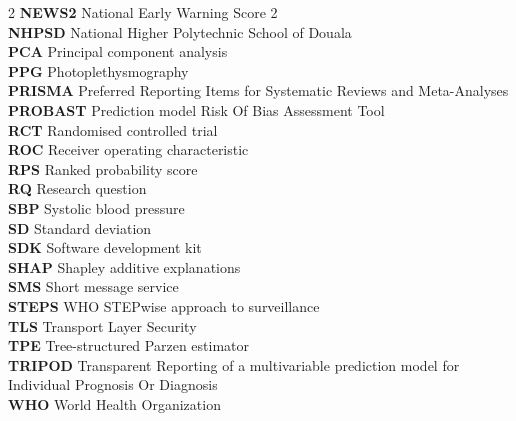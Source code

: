 {\begin{multicols}{2}
\textbf{NEWS2} National Early Warning Score 2\\
\textbf{NHPSD} National Higher Polytechnic School of Douala\\
\textbf{PCA} Principal component analysis\\
\textbf{PPG} Photoplethysmography\\
\textbf{PRISMA} Preferred Reporting Items for Systematic Reviews and Meta-Analyses\\
\textbf{PROBAST} Prediction model Risk Of Bias Assessment Tool\\
\textbf{RCT} Randomised controlled trial\\
\textbf{ROC} Receiver operating characteristic\\
\textbf{RPS} Ranked probability score\\
\textbf{RQ} Research question\\
\textbf{SBP} Systolic blood pressure\\
\textbf{SD} Standard deviation\\
\textbf{SDK} Software development kit\\
\textbf{SHAP} Shapley additive explanations\\
\textbf{SMS} Short message service\\
\textbf{STEPS} WHO STEPwise approach to surveillance\\
\textbf{TLS} Transport Layer Security\\
\textbf{TPE} Tree-structured Parzen estimator\\
\textbf{TRIPOD} Transparent Reporting of a multivariable prediction model for Individual Prognosis Or Diagnosis\\
\textbf{WHO} World Health Organization
\end{multicols}}

\cleardoublepage{}
{}
\listoffigures

\cleardoublepage{}
{}
\listoftables

\clearpage
{}
\setcounter{page}{1}
